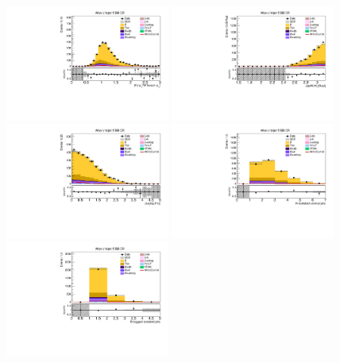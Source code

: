 \begin{figure}[tbp]
  \begin{center}
    \includegraphics[width=0.48\textwidth]{figures/wlnhbb2016/boosted/WenWHTT2bFJCR_fj1WPtBalance.pdf}
    \includegraphics[width=0.48\textwidth]{figures/wlnhbb2016/boosted/WenWHTT2bFJCR_deltaPhiVH.pdf}
    \includegraphics[width=0.48\textwidth]{figures/wlnhbb2016/boosted/WenWHTT2bFJCR_dEtal1fj1.pdf}
    \includegraphics[width=0.48\textwidth]{figures/wlnhbb2016/boosted/WenWHTT2bFJCR_nIsojet.pdf}
    \includegraphics[width=0.48\textwidth]{figures/wlnhbb2016/boosted/WenWHTT2bFJCR_isojetNBtags.pdf}

\end{center}
\end{figure}
